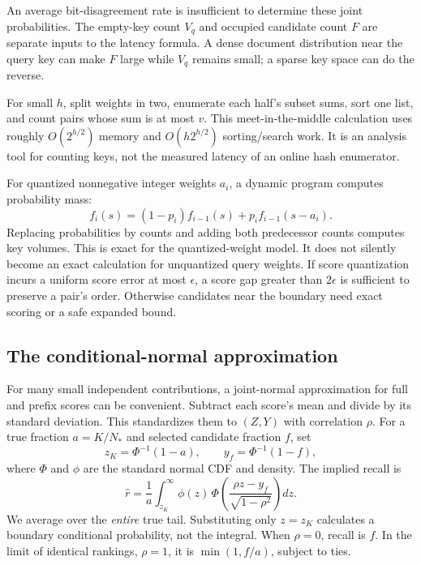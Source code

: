 An average bit-disagreement rate is insufficient to determine these joint probabilities.
The empty-key count $V_q$ and occupied candidate count $F$ are separate inputs to the latency
formula. A dense document distribution near the query key can make $F$ large while $V_q$
remains small; a sparse key space can do the reverse.

For small $h$, split weights in two, enumerate each half's subset sums, sort one list, and
count pairs whose sum is at most $v$. This meet-in-the-middle calculation uses roughly
$O(2^{h/2})$ memory and $O(h2^{h/2})$ sorting/search work. It is an analysis tool for counting
keys, not the measured latency of an online hash enumerator.

For quantized nonnegative integer weights $a_i$, a dynamic program computes probability mass:
\begin{equation}
f_{i}(s)=(1-p_i)f_{i-1}(s)+p_i f_{i-1}(s-a_i).
\label{eq:dp}
\end{equation}
Replacing probabilities by counts and adding both predecessor counts computes key volumes.
This is exact for the quantized-weight model. It does not silently become an exact calculation
for unquantized query weights. If score quantization incurs a uniform score error at most
$\epsilon$, a score gap greater than $2\epsilon$ is sufficient to preserve a pair's order.
Otherwise candidates near the boundary need exact scoring or a safe expanded bound.

\subsection{The conditional-normal approximation}
For many small independent contributions, a joint-normal approximation for full and prefix
scores can be convenient. Subtract each score's mean and divide by its standard deviation. This standardizes them to $(Z,Y)$ with correlation $\rho$. For a true
fraction $a=K/N_*$ and selected candidate fraction $f$, set
\[
z_K=\Phi^{-1}(1-a),\qquad y_f=\Phi^{-1}(1-f),
\]
where $\Phi$ and $\phi$ are the standard normal CDF and density. The implied recall is
\begin{equation}
\widehat r=
\frac{1}{a}\int_{z_K}^{\infty}
\phi(z)\,\Phi\!\left(\frac{\rho z-y_f}{\sqrt{1-\rho^2}}\right)dz.
\label{eq:normal-recall}
\end{equation}
We average over the \emph{entire} true tail. Substituting only $z=z_K$ calculates a boundary
conditional probability, not the integral. When $\rho=0$, recall is $f$. In the limit of
identical rankings, $\rho=1$, it is $\min(1,f/a)$, subject to ties.

